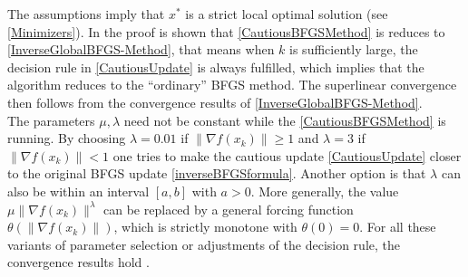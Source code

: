 The assumptions imply that $x^*$ is a strict local optimal solution (see \cref{Minimizers}). In the proof is shown that \cref{CautiousBFGSMethod} is reduces to \cref{InverseGlobalBFGS-Method}, that means when $k$ is sufficiently large, the decision rule in \cref{CautiousUpdate} is always fulfilled, which implies that the algorithm reduces to the “ordinary” BFGS method. The superlinear convergence then follows from the convergence results of \cref{InverseGlobalBFGS-Method}. \\
The parameters $\mu, \lambda$ need not be constant while the \cref{CautiousBFGSMethod} is running. By choosing $\lambda = 0.01$ if $\lVert \nabla f(x_k) \rVert \geq 1$ and $\lambda = 3$ if $\lVert \nabla f(x_k) \rVert < 1$ one tries to make the cautious update \cref{CautiousUpdate} closer to the original BFGS update \cref{inverseBFGSformula}. Another option is that $\lambda$ can also be within an interval $[a,b]$ with $a>0$. More generally, the value $\mu \lVert \nabla f(x_k) \rVert^{\lambda}$ can be replaced by a general forcing function $\theta(\lVert \nabla f(x_k) \rVert)$, which is strictly monotone with $\theta(0) = 0$. For all these variants of parameter selection or adjustments of the decision rule, the convergence results hold \cite[p.~1059-1060]{LiFukushima:2001}. \\

